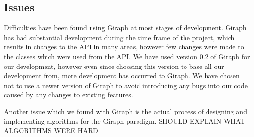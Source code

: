 \subsection{Issues}
Difficulties have been found using Giraph at most stages of development. Giraph has had substantial development during the time frame of the project, which results in changes to the API in many areas, however few changes were made to the classes which were used from the API. We have used version 0.2 of Giraph for our development, however even since choosing this version to base all our development from, more development has occurred to Giraph. We have chosen not to use a newer version of Giraph to avoid introducing any bugs into our code caused by any changes to existing features.

Another issue which we found with Giraph is the actual process of designing and implementing algorithms for the Giraph paradigm. SHOULD EXPLAIN WHAT ALGORITHMS WERE HARD